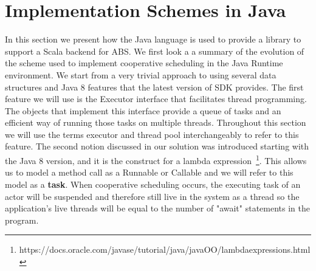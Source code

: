 \section{Implementation Schemes in Java}
\label{sec:scheme}

In this section we present how the Java language is used to provide a library to support a Scala backend for ABS. We first look a a summary of the evolution of the scheme used to implement cooperative scheduling in the Java Runtime environment. We start  from a very trivial approach to using several data structures and Java 8 features that the latest version of SDK provides. The first feature we will use is the Executor interface that facilitates thread programming. The objects that implement this interface provide a queue of tasks and an efficient way of running those tasks on multiple threads. Throughout this section we will use the terms executor and thread pool interchangeably to refer to this feature. The second notion discussed in our solution was introduced starting with the Java 8 version, and it is the construct for a lambda expression~\footnote{https://docs.oracle.com/javase/tutorial/java/javaOO/lambdaexpressions.html}. This allows us to model a method call as a Runnable or Callable and we will refer to this model as a \textbf{task}. When cooperative scheduling occurs, the executing task of an actor will be suspended and therefore still live in the system as a thread so the application's live threads will be equal to the number of "await" statements in the program. 

%

